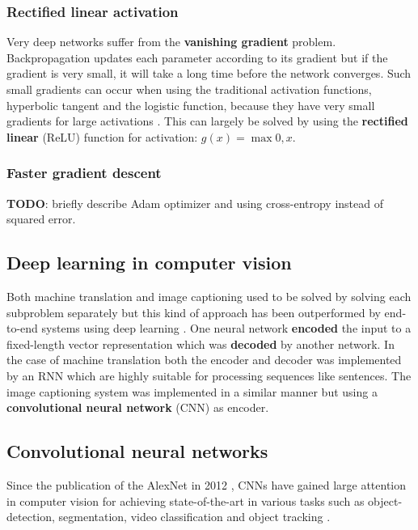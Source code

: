 \subsubsection{Rectified linear activation}

Very deep networks suffer from the \textbf{vanishing gradient} problem.
Backpropagation updates each parameter according to its gradient but if the gradient is very small, it will take a long time before the network converges.
Such small gradients can occur when using the traditional activation functions, hyperbolic tangent and the logistic function, because they have very small gradients for large activations \cite{AlexNet}.
This can largely be solved by using the \textbf{rectified linear} (ReLU) function for activation: $g(x) = \max{0, x}$.

\subsubsection{Faster gradient descent}
\textbf{TODO}: briefly describe Adam optimizer and using cross-entropy instead of squared error.

\subsection{Deep learning in computer vision}

Both machine translation and image captioning used to be solved by solving each subproblem separately but this kind of approach has been outperformed by end-to-end systems using deep learning \cite{ShowAndTell}. One neural network \textbf{encoded} the input to a fixed-length vector representation which was \textbf{decoded} by another network. In the case of machine translation both the encoder and decoder was implemented by an RNN which are highly suitable for processing sequences like sentences. The image captioning system was implemented in a similar manner but using a \textbf{convolutional neural network} (CNN) as encoder.


\subsection{Convolutional neural networks}

Since the publication of the AlexNet in 2012 \cite{AlexNet}, CNNs have gained large attention in computer vision for achieving state-of-the-art in various tasks such as object-detection, segmentation, video classification and object tracking \cite{InceptionV3}.

